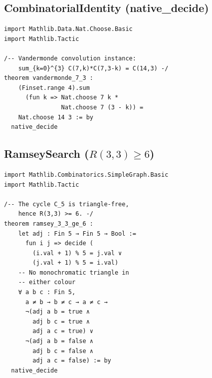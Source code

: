 \documentclass[11pt,a4paper]{article}
\begin{document}
\subsection{CombinatorialIdentity (native\_decide)}

\begin{lstlisting}[caption={CombinatorialIdentity.lean --- Vandermonde instance at $n=7$.},label={lst:identity}]
import Mathlib.Data.Nat.Choose.Basic
import Mathlib.Tactic

/-- Vandermonde convolution instance:
    sum_{k=0}^{3} C(7,k)*C(7,3-k) = C(14,3) -/
theorem vandermonde_7_3 :
    (Finset.range 4).sum
      (fun k => Nat.choose 7 k *
                Nat.choose 7 (3 - k)) =
    Nat.choose 14 3 := by
  native_decide
\end{lstlisting}

\subsection{RamseySearch ($R(3,3) \geq 6$)}

\begin{lstlisting}[caption={RamseySearch.lean --- $R(3,3) \geq 6$ via $C_5$ colouring.},label={lst:ramsey}]
import Mathlib.Combinatorics.SimpleGraph.Basic
import Mathlib.Tactic

/-- The cycle C_5 is triangle-free,
    hence R(3,3) >= 6. -/
theorem ramsey_3_3_ge_6 :
    let adj : Fin 5 → Fin 5 → Bool :=
      fun i j => decide (
        (i.val + 1) % 5 = j.val ∨
        (j.val + 1) % 5 = i.val)
    -- No monochromatic triangle in
    -- either colour
    ∀ a b c : Fin 5,
      a ≠ b → b ≠ c → a ≠ c →
      ¬(adj a b = true ∧
        adj b c = true ∧
        adj a c = true) ∨
      ¬(adj a b = false ∧
        adj b c = false ∧
        adj a c = false) := by
  native_decide
\end{lstlisting}
\end{document}
